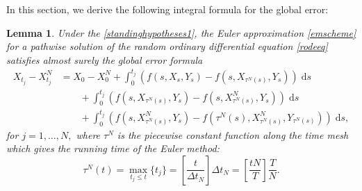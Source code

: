 \documentclass[reqno,12pt]{amsart}
\theoremstyle{plain} %
\newtheorem{lemma}{Lemma}[section]
\theoremstyle{definition} %
\begin{document}
In this section, we derive the following integral formula for the global error:
\begin{lemma}
    \label{lemglobalerrorintegralformula}
    Under the \cref{standinghypotheses1}, the Euler approximation \cref{emscheme} for a pathwise solution of the random ordinary differential equation \cref{rodeeq} satisfies almost surely the global error formula
    \begin{equation}
        \label{globalerrorintegralformula}
        \begin{aligned}
            X_{t_j} - X_{t_j}^N & = X_0 - X_0^N + \int_0^{t_j} \left( f(s, X_s, Y_s) - f(s, X_{\tau^N(s)}, Y_s) \right)\;\mathrm{d}s  \\ 
            & \qquad + \int_{0}^{t_j} \left( f(s, X_{\tau^N(s)}, Y_s) - f(s, X_{\tau^N(s)}^N, Y_s) \right)\;\mathrm{d}s \\
            & \qquad + \int_0^{t_j} \left( f(s, X_{\tau^N(s)}^N, Y_s) - f(\tau^N(s), X_{\tau^N(s)}^N, Y_{\tau^N(s)}) \right)\;\mathrm{d}s,
        \end{aligned}
    \end{equation}
    for $j = 1, \ldots, N,$ where $\tau^N$ is the piecewise constant function along the time mesh which gives the running time of the Euler method:
    \begin{equation}
        \label{tauNt}
        \tau^N(t) = \max_{t_j \leq t}\{t_j\} = \left[\frac{t}{\Delta t_N}\right]\Delta t_N = \left[\frac{tN}{T}\right]\frac{T}{N}.
    \end{equation}
\end{lemma}
\end{document}
